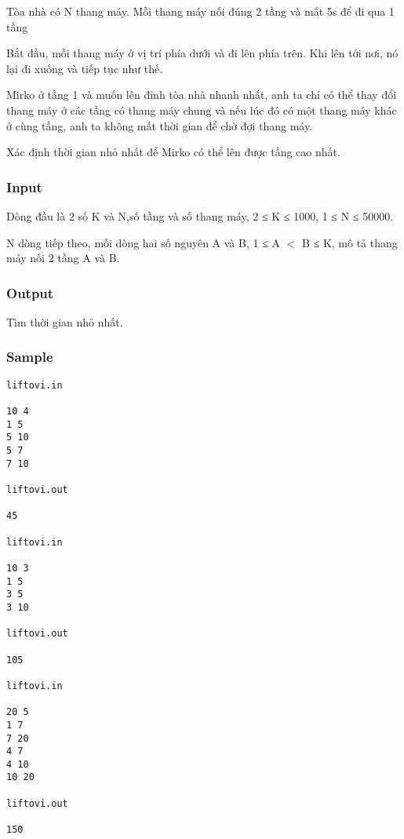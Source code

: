 



   Tòa nhà có N thang máy. Mỗi thang máy nối đúng 2 tầng và mất 5s để đi qua 1 tầng  

   Bắt đầu, mỗi thang máy ở vị trí phía dưới và đi lên phía trên. Khi lên tới nơi, nó lại đi xuống và tiếp tục như thế.  

   Mirko ở tầng 1 và muốn lên đỉnh tòa nhà nhanh nhất, anh ta chỉ có thể thay đổi thang máy ở các tầng có thang máy chung và nếu lúc đó có một thang máy khác ở cùng tầng, anh ta không mất thời gian để chờ đợi thang máy.  

   Xác định thời gian nhỏ nhất để Mirko có thể lên được tầng cao nhất.  



\subsubsection{   Input  }



   Dòng đầu là 2 số K và N,số tầng và số thang máy, 2 ≤ K ≤ 1000, 1 ≤ N ≤ 50000.  

   N dòng tiếp theo, mỗi dòng hai số nguyên A và B,  1 ≤ A $<$ B ≤ K, mô tả thang máy nối 2 tầng A và B.  





\subsubsection{   Output  }



   Tìm thời gian nhỏ nhất.  



\subsubsection{   Sample  }
\begin{verbatim}
liftovi.in 
 
10 4 
1 5 
5 10 
5 7 
7 10 
 
liftovi.out 
 
45 

liftovi.in 
 
10 3 
1 5 
3 5 
3 10 
 
liftovi.out 
 
105 

liftovi.in 
 
20 5 
1 7 
7 20 
4 7 
4 10 
10 20 
 
liftovi.out 
 
150 

\end{verbatim}